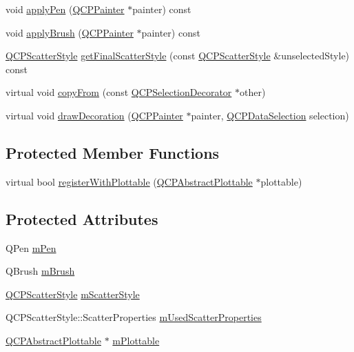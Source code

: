 \begin{DoxyCompactItemize}
\item 
void \mbox{\hyperlink{class_q_c_p_selection_decorator_a75098893f7d08660ea449206810679d7}{apply\+Pen}} (\mbox{\hyperlink{class_q_c_p_painter}{Q\+C\+P\+Painter}} $\ast$painter) const
\item 
void \mbox{\hyperlink{class_q_c_p_selection_decorator_a225544527d51b49546b70d0e6d655a34}{apply\+Brush}} (\mbox{\hyperlink{class_q_c_p_painter}{Q\+C\+P\+Painter}} $\ast$painter) const
\item 
\mbox{\hyperlink{class_q_c_p_scatter_style}{Q\+C\+P\+Scatter\+Style}} \mbox{\hyperlink{class_q_c_p_selection_decorator_a1277b373248896bc70e8cc1de96da9fa}{get\+Final\+Scatter\+Style}} (const \mbox{\hyperlink{class_q_c_p_scatter_style}{Q\+C\+P\+Scatter\+Style}} \&unselected\+Style) const
\item 
virtual void \mbox{\hyperlink{class_q_c_p_selection_decorator_a467a8d5cfcab27e862a17c797ac27b8a}{copy\+From}} (const \mbox{\hyperlink{class_q_c_p_selection_decorator}{Q\+C\+P\+Selection\+Decorator}} $\ast$other)
\item 
virtual void \mbox{\hyperlink{class_q_c_p_selection_decorator_a4f8eb49e277063845391e803ae23054a}{draw\+Decoration}} (\mbox{\hyperlink{class_q_c_p_painter}{Q\+C\+P\+Painter}} $\ast$painter, \mbox{\hyperlink{class_q_c_p_data_selection}{Q\+C\+P\+Data\+Selection}} selection)
\end{DoxyCompactItemize}
\subsection*{Protected Member Functions}
\begin{DoxyCompactItemize}
\item 
virtual bool \mbox{\hyperlink{class_q_c_p_selection_decorator_af66cb39e308da0285ae5d533e1e85027}{register\+With\+Plottable}} (\mbox{\hyperlink{class_q_c_p_abstract_plottable}{Q\+C\+P\+Abstract\+Plottable}} $\ast$plottable)
\end{DoxyCompactItemize}
\subsection*{Protected Attributes}
\begin{DoxyCompactItemize}
\item 
Q\+Pen \mbox{\hyperlink{class_q_c_p_selection_decorator_a684a691c146a5bac927c0146bd28d557}{m\+Pen}}
\item 
Q\+Brush \mbox{\hyperlink{class_q_c_p_selection_decorator_a4e3a3a01fdec5b018c0c59a0b6ae9f70}{m\+Brush}}
\item 
\mbox{\hyperlink{class_q_c_p_scatter_style}{Q\+C\+P\+Scatter\+Style}} \mbox{\hyperlink{class_q_c_p_selection_decorator_a5b822197a1bf802c5cf8c3dc43ca549a}{m\+Scatter\+Style}}
\item 
Q\+C\+P\+Scatter\+Style\+::\+Scatter\+Properties \mbox{\hyperlink{class_q_c_p_selection_decorator_acb4f6af085283c9ce7d5c168fb53e855}{m\+Used\+Scatter\+Properties}}
\item 
\mbox{\hyperlink{class_q_c_p_abstract_plottable}{Q\+C\+P\+Abstract\+Plottable}} $\ast$ \mbox{\hyperlink{class_q_c_p_selection_decorator_a25250a1d29b0723c4fa59a97e62f5758}{m\+Plottable}}
\end{DoxyCompactItemize}
